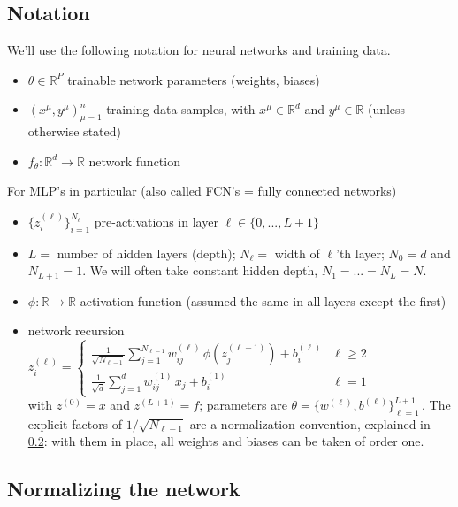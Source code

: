 \documentclass[11pt]{article}
\newcommand{\R}{\mathbb{R}}
\begin{document}
\subsection{Notation}
\label{sec:setup}

We'll use the following notation for neural networks and training data.

\begin{itemize}
    \item $\theta\in \R^P$ trainable network parameters (weights, biases)
    \item $(x^\mu,y^\mu)_{\mu=1}^n$ training data samples, with $x^\mu\in \R^d$ and $y^\mu\in \R$ (unless otherwise stated)
    \item $f_\theta:\R^d\to \R$ network function
\end{itemize}

\noindent For MLP's in particular (also called FCN's = fully connected networks)
\begin{itemize}
    \item $\{z_i^{(\ell)}\}_{i=1}^{N_\ell}$ pre-activations in layer $\ell\in \{0,...,L+1\}$
    \item $L=$ number of hidden layers (depth); $N_\ell = $ width of $\ell$'th layer; $N_0=d$ and $N_{L+1}=1$. We will often take constant hidden depth, $N_1=...=N_L=N$.
    \item $\phi:\R\to \R$ activation function (assumed the same in all layers except the first) 
    \item network recursion $z_i^{(\ell)} = \begin{cases} \frac{1}{\sqrt{N_{\ell-1}}}\sum_{j=1}^{N_{\ell-1}}w^{(\ell)}_{ij}\,\phi(z^{(\ell-1)}_j)+ b^{(\ell)}_i & \ell\geq 2 \\[.2cm]  \frac{1}{\sqrt d}\sum_{j=1}^{d}w^{(1)}_{ij}\,x_j+ b^{(1)}_i & \ell = 1 \end{cases}$ \\
    with $z^{(0)} = x$ and $z^{(L+1)} = f$; parameters are $\theta = \{w^{(\ell)},b^{(\ell)}\}_{\ell=1}^{L+1}$\,. The explicit factors of $1/\sqrt{N_{\ell-1}}$ are a normalization convention, explained in \cref{sec:basicscaling}: with them in place, all weights and biases can be taken of order one.
\end{itemize}


\subsection{Normalizing the network}
\label{sec:basicscaling}
\end{document}
